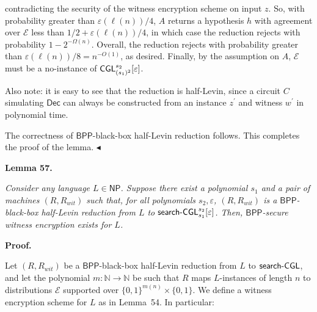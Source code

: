 \documentclass[10pt,a4paper]{article}
\begin{document}
contradicting the security of the witness encryption scheme on input $z$. So, with probability greater than $\varepsilon(\ell(n))/4$, $A$ returns a hypothesis $h$ with agreement over $\mathcal{E}$ less than $1/2+\varepsilon(\ell(n))/4$, in which case the reduction rejects with probability $1-2^{-\Omega(n)}$. Overall, the reduction rejects with probability greater than $\varepsilon(\ell(n))/8=n^{-O(1)}$, as desired. Finally, by the assumption on $A$, $\mathcal{E}$ must be a no-instance of ${\sf CGL}_{(s_{1})^{2}}^{s_{2}}[\varepsilon]$.\par




Also note: it is easy to see that the reduction is half-Levin, since a circuit $C$ simulating ${\mathsf{Dec}}$ can always be constructed from an instance $z^{\prime}$ and witness $w^{\prime}$ in polynomial time.\par




The correctness of ${\mathsf{BPP}}$-black-box half-Levin reduction follows. This completes the proof of the lemma.
$\blacktriangleleft$\par





\par\medskip\noindent\textbf{
\textbf{Lemma 57}\textbf{.}
}\par



\emph{Consider any language $L\in{\mathsf{NP}}$. Suppose there exist a polynomial $s_{1}$ and a pair of machines $(R,R_{wit})$ such that, for all polynomials $s_{2},\varepsilon$, $(R,R_{wit})$ is a ${\mathsf{BPP}}$-black-box half-Levin reduction from $L$ to ${\sf search}\text{-}{\sf CGL}_{s_{1}}^{s_{2}}[\varepsilon]$. Then, ${\mathsf{BPP}}$-secure witness encryption exists for $L$.}\par







\par\medskip\noindent\textbf{Proof.}\par




Let $(R,R_{wit})$ be a ${\mathsf{BPP}}$-black-box half-Levin reduction from $L$ to ${\sf search}\text{-}{\sf CGL}$, and let the polynomial $m:\mathbb{N}\to\mathbb{N}$ be such that $R$ maps $L$-instances of length $n$ to distributions $\mathcal{E}$ supported over $\{0,1\}^{m(n)}\times\{0,1\}$. We define a witness encryption scheme for $L$ as in Lemma 54. In particular:\par
\end{document}
